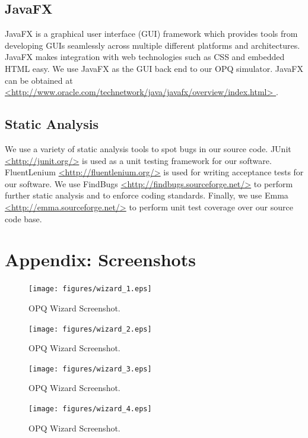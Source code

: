 \subsection{JavaFX}
JavaFX is a graphical user interface (GUI) framework which provides tools from developing GUIs seamlessly across multiple different platforms and architectures. JavaFX makes integration with web technologies such as CSS and embedded HTML easy. We use JavaFX as the GUI back end to our OPQ simulator. JavaFX can be obtained at \url{<http://www.oracle.com/technetwork/java/javafx/overview/index.html>  }.

\subsection{Static Analysis}
We use a variety of static analysis tools to spot bugs in our source code. JUnit \url{<http://junit.org/>} is used as a unit testing framework for our software. FluentLenium \url{<http://fluentlenium.org/>} is used for writing acceptance tests for our software. We use FindBugs \url{<http://findbugs.sourceforge.net/>} to perform further static analysis and to enforce coding standards. Finally, we use Emma \url{<http://emma.sourceforge.net/>} to perform unit test coverage over our source code base.

\newpage

\section{Appendix: Screenshots}
\begin{figure}[htbp]
	\centering
	\texttt{[image: figures/wizard\_1.eps]}
	\caption{OPQ Wizard Screenshot.}
	\label{fig:wizard_1}
\end{figure}

\begin{figure}[htbp]
	\centering
	\texttt{[image: figures/wizard\_2.eps]}
	\caption{OPQ Wizard Screenshot.}
	\label{fig:wizard_2}
\end{figure}

\begin{figure}[htbp]
	\centering
	\texttt{[image: figures/wizard\_3.eps]}
	\caption{OPQ Wizard Screenshot.}
	\label{fig:wizard_3}
\end{figure}

\begin{figure}[htbp]
	\centering
	\texttt{[image: figures/wizard\_4.eps]}
	\caption{OPQ Wizard Screenshot.}
	\label{fig:wizard_4}
\end{figure}

